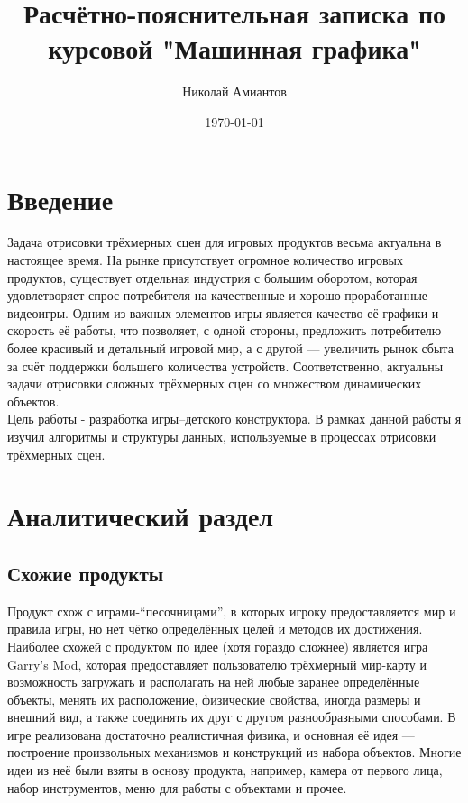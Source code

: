 \documentclass[a4paper,12pt]{report}
\title{Расчётно-пояснительная записка по курсовой "Машинная графика"}
\author{Николай Амиантов}
\date{\today}
\begin{document}
\maketitle

\section{Введение}

Задача отрисовки трёхмерных сцен для игровых продуктов весьма актуальна в настоящее время. На рынке присутствует огромное количество игровых продуктов, существует отдельная индустрия с большим оборотом, которая удовлетворяет спрос потребителя на качественные и хорошо проработанные видеоигры. Одним из важных элементов игры является качество её графики и скорость её работы, что позволяет, с одной стороны, предложить потребителю более красивый и детальный игровой мир, а с другой --- увеличить рынок сбыта за счёт поддержки большего количества устройств. Соответственно, актуальны задачи отрисовки сложных трёхмерных сцен со множеством динамических объектов. \\
Цель работы - разработка игры--детского конструктора. В рамках данной работы я изучил алгоритмы и структуры данных, используемые в процессах отрисовки трёхмерных сцен.

\section{Аналитический раздел}

\subsection{Схожие продукты}
Продукт схож с играми-``песочницами'', в которых игроку предоставляется мир и правила игры, но нет чётко определённых целей и методов их достижения. Наиболее схожей с продуктом по идее (хотя гораздо сложнее) является игра Garry's Mod, которая предоставляет пользователю трёхмерный мир-карту и возможность загружать и располагать на ней любые заранее определённые объекты, менять их расположение, физические свойства, иногда размеры и внешний вид, а также соединять их друг с другом разнообразными способами. В игре реализована достаточно реалистичная физика, и основная её идея --- построение произвольных механизмов и конструкций из набора объектов. Многие идеи из неё были взяты в основу продукта, например, камера от первого лица, набор инструментов, меню для работы с объектами и прочее.
\end{document}
